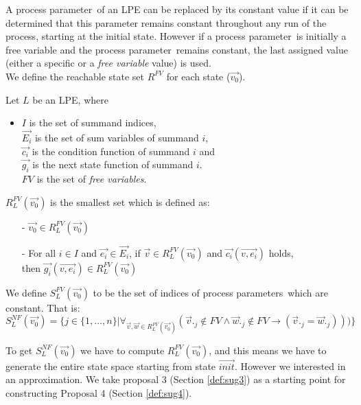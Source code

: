 \index{}\documentclass[a4paper,10pt]{article}
\theoremstyle{plain}
\theoremstyle{definition}
\newcommand{\ovr}{\overrightarrow}
\newcommand{\pp}{process parameter}
\newcommand{\pps}{process parameters}
\newcommand{\ti}{\textit}
\begin{document}
A \pp\ of an LPE can be replaced by its constant value if it can be determined that this parameter remains constant throughout any run of the process, starting at the initial state. However if a \pp\ is initially a free variable and the \pp\ remains constant, the last assigned value (either a specific or a \ti{free variable} value) is used.\\

We define the reachable state set $R^{FV}$ for each state ($\ovr{v_0}$). 
\begin{defn}\label{def:lpe} Let $L$ be an LPE, where\begin{itemize}
\item $I$ is the set of summand indices, \\ $\ovr{E_i}$ is the set of sum variables of summand $i$, \\ $\ovr{c_i}$ is the condition function of summand $i$ and \\ $\ovr{g_i}$ is the next state function of summand $i$. \\
$FV$ is the set of \ti{free variables}.\\
\end{itemize}

$R_L^{FV}(\ovr{v_0})$ is the smallest set which is defined as:
  \begin{itemize}
    \item[-] $\ovr{v_0} \in R_L^{FV}(\ovr{v_0})$
    \item[-] For all $i \in I$ and $\ovr{e_i} \in \ovr{E_i}$, if $\ovr{v} \in R_L^{FV}(\ovr{v_0})$ and $\ovr{c_i}(\ovr{v, e_i})$ holds, \\ then $\ovr{g_i}(\ovr{v, e_i}) \in R_L^{FV}(\ovr{v_0})$ \\
   \end{itemize}
\end{defn}

\begin{defn}\label{def:lpe_comp_fv} We define $S_L^{FV}(\ovr{v_0})$ to be the set of indices of \pps\ which are constant. That is:\\

$S_L^{NF}(\ovr{v_0}) = \lbrace j \in  \lbrace 1, \ldots, n \rbrace \vert \forall_{\ovr{v}, \ovr{w} \in R_L^{FV}(\ovr{v_0})}( \ovr{v}._j \not\in FV \wedge \ovr{w}._j \not\in FV \rightarrow ( \ovr{v}._j = \ovr{w}._j)))
\rbrace $
\end{defn}

To get $S_L^{NF} (\ovr{v_0})$ we have to compute $R_L^{FV}(\ovr{v_0})$, and this means we have to generate the entire state space starting from state $\ovr{init}$. However we interested in an approximation. We take proposal 3 (Section \ref{def:sug3}) as a starting point for constructing Proposal 4 (Section \ref{def:sug4}).
\end{document}
